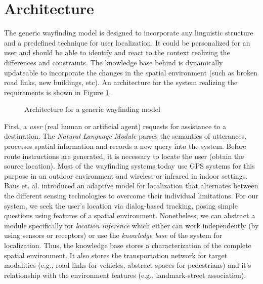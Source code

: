 \documentclass{iitkthesis}
\begin{document}
 \section{Architecture}
The generic wayfinding model is designed to incorporate any linguistic 
structure and a predefined technique for user localization. It could 
be personalized for an user and should be able to identify and react to 
the context realizing the differences and constraints. The knowledge base 
behind is dynamically updateable to incorporate 
the changes in the spatial environment (such as broken road links, new 
buildings, etc). An architecture for the system realizing the requirements is 
shown in Figure \ref{fig:arc}. 
 \begin{figure}
\centering
\caption{Architecture for a generic wayfinding model}
\label{fig:arc}
 \end{figure}
First, a \textit{user} (real human or artificial agent) requests for assistance 
to a destination. The \textit{Natural Language Module} parses the 
semantics of utterances, processes spatial information and records a new 
query into the system. Before route instructions are generated, it 
is necessary to locate the user (obtain the source location). Most of the 
wayfinding systems today use GPS systems for this purpose in an outdoor 
environment and wireless or infrared in indoor settings. Baus et. 
al. \cite{baus} introduced an adaptive model for localization that 
alternates between the different sensing technologies to overcome their 
individual limitations. For our system, we seek 
the user's location via dialog-based tracking, posing simple questions 
using features of a spatial environment. Nonetheless, we can abstract a 
module specifically for \textit{location inference} which either can work 
independently (by using sensors or receptors) or use the 
\textit{knowledge base} of the system for localization. Thus, the 
knowledge base stores a characterization of the complete spatial 
environment. It also stores the transportation network for target modalities 
(e.g., road links for vehicles, abstract spaces for pedestrians) and it's 
relationship with the environment features (e.g., landmark-street 
association).
\end{document}
